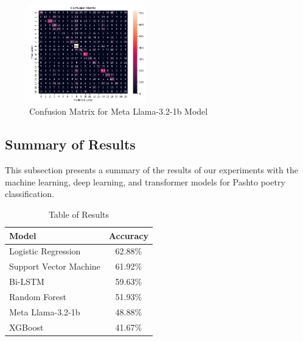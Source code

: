 \begin{figure}[H]
    \centering
    \includegraphics[width=0.45\textwidth]{llama_confmat.png}
    \caption{Confusion Matrix for Meta Llama-3.2-1b Model}
    \label{fig:llama_confmat}
\end{figure}


\subsection{Summary of Results}

This subsection presents a summary of the results of our experiments with the machine learning, deep learning, and transformer models for Pashto poetry classification.

\begin{table}[ht]
    \centering
    \begin{tabular}{|l|c|}
        \hline
        \textbf{Model} & \textbf{Accuracy} \\
        \hline
        Logistic Regression & 62.88\% \\
        Support Vector Machine & 61.92\% \\
        Bi-LSTM & 59.63\% \\
        Random Forest & 51.93\% \\
        Meta Llama-3.2-1b & 48.88\% \\
        XGBoost & 41.67\% \\
        \hline
    \end{tabular}
    \caption{Table of Results}
    \label{tab:results}
\end{table}



